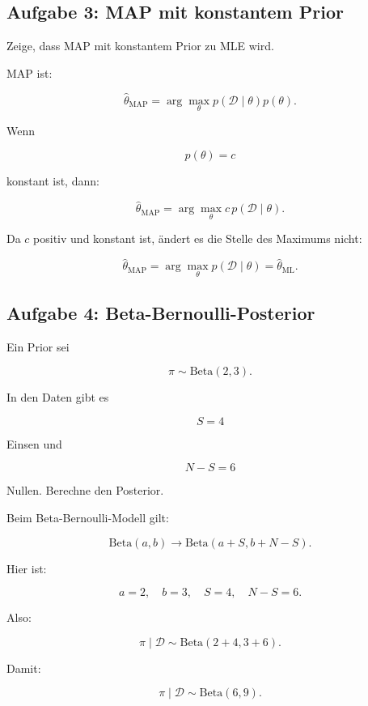 \subsection{Aufgabe 3: MAP mit konstantem Prior}

Zeige, dass MAP mit konstantem Prior zu MLE wird.

\begin{examplebox}
MAP ist:

\[
    \hat{\theta}_{\mathrm{MAP}}
    =
    \arg\max_{\theta}
    p(\mathcal{D}\mid\theta)p(\theta).
\]

Wenn

\[
    p(\theta)=c
\]

konstant ist, dann:

\[
    \hat{\theta}_{\mathrm{MAP}}
    =
    \arg\max_{\theta}
    c\,p(\mathcal{D}\mid\theta).
\]

Da \(c\) positiv und konstant ist, ändert es die Stelle des Maximums nicht:

\[
    \hat{\theta}_{\mathrm{MAP}}
    =
    \arg\max_{\theta}
    p(\mathcal{D}\mid\theta)
    =
    \hat{\theta}_{\mathrm{ML}}.
\]
\end{examplebox}

\subsection{Aufgabe 4: Beta-Bernoulli-Posterior}

Ein Prior sei

\[
    \pi \sim \mathrm{Beta}(2,3).
\]

In den Daten gibt es

\[
    S=4
\]

Einsen und

\[
    N-S=6
\]

Nullen.
Berechne den Posterior.

\begin{examplebox}
Beim Beta-Bernoulli-Modell gilt:

\[
    \mathrm{Beta}(a,b)
    \longrightarrow
    \mathrm{Beta}(a+S,b+N-S).
\]

Hier ist:

\[
    a=2,
    \quad
    b=3,
    \quad
    S=4,
    \quad
    N-S=6.
\]

Also:

\[
    \pi \mid \mathcal{D}
    \sim
    \mathrm{Beta}(2+4,3+6).
\]

Damit:

\[
    \pi \mid \mathcal{D}
    \sim
    \mathrm{Beta}(6,9).
\]
\end{examplebox}

